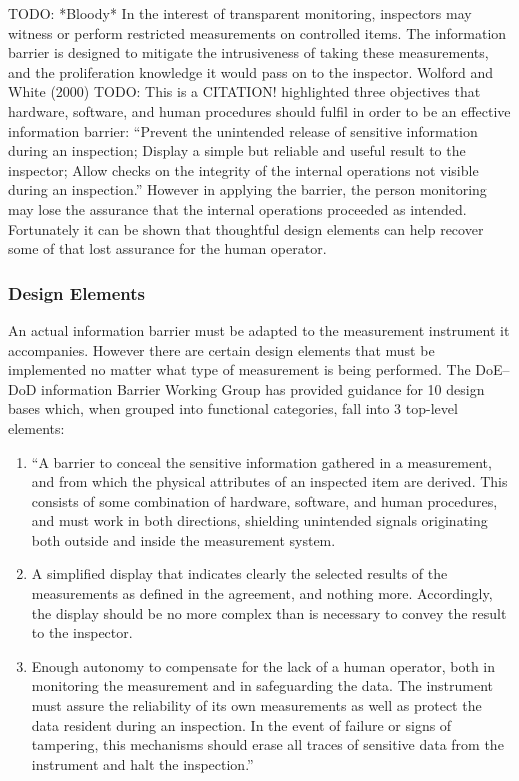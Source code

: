 \documentclass[twoside,titlepage,11pt,twocolumn,a4paper]{article}
\begin{document}
TODO: *Bloody* \citep{wolford2000} In the
interest of transparent monitoring, inspectors may witness or perform
restricted measurements on controlled items. The information barrier
is designed to mitigate the intrusiveness of taking these
measurements, and the proliferation knowledge it would pass on to the
inspector. Wolford and White (2000) TODO: This is a CITATION!
highlighted three objectives that hardware, software, and human
procedures should fulfil in order to be an effective information
barrier: ``Prevent the unintended release of sensitive information
during an inspection; Display a simple but reliable and useful result
to the inspector; Allow checks on the integrity of the internal
operations not visible during an inspection.''  However in applying
the barrier, the person monitoring may lose the assurance that the
internal operations proceeded as intended. Fortunately it can be shown
that thoughtful design elements can help recover some of that lost
assurance for the human operator.

\subsubsection{Design Elements}
An actual information barrier must be adapted to the measurement
instrument it accompanies. However there are certain design elements
that must be implemented no matter what type of measurement is being
performed. The DoE--DoD information Barrier Working Group has provided
guidance for 10 design bases which, when grouped into functional
categories, fall into 3 top-level elements:
\begin{enumerate}
  \item ``A barrier to conceal the sensitive information gathered in a
    measurement, and from which the physical attributes of an
    inspected item are derived. This consists of some combination of
    hardware, software, and human procedures, and must work in both
    directions, shielding unintended signals originating both outside
    and inside the measurement system.
  \item A simplified display that indicates clearly the selected
    results of the measurements as defined in the agreement, and
    nothing more. Accordingly, the display should be no more complex
    than is necessary to convey the result to the inspector.
  \item Enough autonomy to compensate for the lack of a human
    operator, both in monitoring the measurement and in safeguarding
    the data. The instrument must assure the reliability of its own
    measurements as well as protect the data resident during an
    inspection. In the event of failure or signs of tampering, this
    mechanisms should erase all traces of sensitive data from the
    instrument and halt the inspection.'' \citep{depDoE1999}
\end{enumerate}
\end{document}
